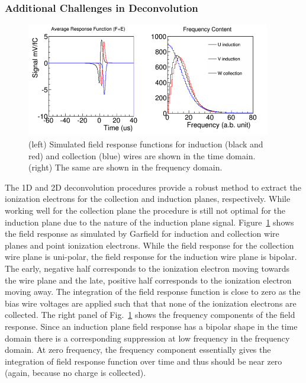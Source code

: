 \subsubsection{Additional Challenges in Deconvolution}

\begin{figure}[htb]
\centering
\includegraphics[width=0.95\textwidth]{figures/induction_field_response.png}
\caption{(left) Simulated field response functions for induction (black and red) and 
collection (blue) wires are shown in the time domain. (right) The same are shown in 
the frequency domain.}
\label{fig:induction_field}
\end{figure}

The 1D and 2D deconvolution procedures provide a robust method to extract the ionization
electrons for the collection and induction planes, respectively. 
%
While working well for the collection plane the procedure is still not optimal for the induction plane due to the 
nature of the induction plane signal. Figure~\ref{fig:induction_field} shows the 
field response as simulated by Garfield for induction and collection wire planes and point ionization
electrons. While the field response for the collection wire plane is uni-polar, the field 
response for the induction wire plane is bipolar. 
%
The early, negative half corresponds to the ionization electron moving
towards the wire plane and the late, positive half corresponds
to the ionization electron moving away.
%
The integration of the field response function is close to zero
as the bias wire voltages are applied such that that none of the ionization electrons are
collected. The right panel of Fig.~\ref{fig:induction_field} shows the 
frequency components of the field response. 
%
Since an induction plane field response has a
bipolar shape in the time domain there is a corresponding suppression at low frequency in the frequency 
domain. At zero frequency, the frequency component essentially gives the 
integration of field response function over time and thus should be near zero (again, because no charge is collected).


